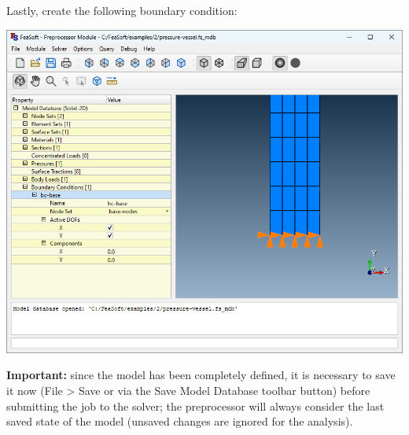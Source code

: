 \documentclass[
    11pt,        %
    a4paper,     %
    final,       %
    fleqn,       %
    notitlepage, %
    onecolumn,   %
    oneside,     %
]{article}
\begin{document}
Lastly, create the following boundary condition:
\begin{center}
\end{center}
\begin{center}
    \includegraphics[scale=0.5]{fig/ui-2-11.png}
\end{center}

\textbf{Important:} since the model has been completely defined, it is necessary to save it now (File > Save or via the Save Model Database toolbar button) before submitting the job to the solver; the preprocessor will always consider the last saved state of the model (unsaved changes are ignored for the analysis).
\end{document}
